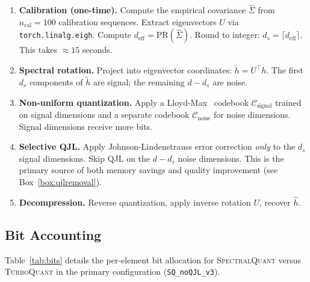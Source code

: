 \documentclass[11pt]{article}
\newcommand{\deff}{d_{\mathrm{eff}}}
\newcommand{\PR}{\mathrm{PR}}
\newcommand{\TQ}{\textsc{TurboQuant}}
\newcommand{\SQ}{\textsc{SpectralQuant}}
\begin{document}
\begin{enumerate}[leftmargin=2em]
\item \textbf{Calibration (one-time).}  Compute the empirical covariance
  $\hat{\Sigma}$ from $n_{\mathrm{cal}} = 100$ calibration sequences.  Extract
  eigenvectors $U$ via \texttt{torch.linalg.eigh}.  Compute $\deff =
  \PR(\hat{\Sigma})$.  Round to integer: $d_s = \lceil \deff \rceil$.
  This takes $\approx 15$ seconds.

\item \textbf{Spectral rotation.}  Project into eigenvector coordinates:
  $\tilde{h} = U^\top h$.  The first $d_s$ components of $\tilde{h}$ are
  signal; the remaining $d - d_s$ are noise.

\item \textbf{Non-uniform quantization.}  Apply a Lloyd-Max~\citep{lloyd1982least} codebook
  $\mathcal{C}_{\mathrm{signal}}$ trained on signal dimensions and a separate
  codebook $\mathcal{C}_{\mathrm{noise}}$ for noise dimensions.  Signal
  dimensions receive more bits.

\item \textbf{Selective QJL.}  Apply Johnson-Lindenstrauss error correction
  \emph{only} to the $d_s$ signal dimensions.  Skip QJL on the $d - d_s$
  noise dimensions.  This is the primary source of both memory savings and
  quality improvement (see Box~\ref{box:qjlremoval}).

\item \textbf{Decompression.}  Reverse quantization, apply inverse rotation
  $U$, recover $\hat{h}$.
\end{enumerate}

\subsection{Bit Accounting}
\label{subsec:bits}

Table~\ref{tab:bits} details the per-element bit allocation for \SQ{} versus
\TQ{} in the primary configuration (\texttt{SQ\_noQJL\_v3}).
\end{document}
